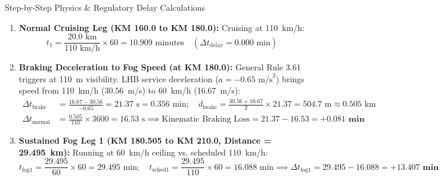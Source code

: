 \documentclass[10pt, a4paper]{article}
\begin{document}
\begin{statutebox}{Step-by-Step Physics \& Regulatory Delay Calculations}
\begin{enumerate}[leftmargin=4mm, itemsep=2pt]
  \item \textbf{Normal Cruising Leg (KM 160.0 to KM 180.0):} Cruising at 110~km/h:
  \begin{equation*}
    t_1 = \frac{20.0\text{ km}}{110\text{ km/h}} \times 60 = 10.909\text{ minutes} \quad (\Delta t_{\text{delay}} = 0.000\text{ min})
  \end{equation*}

  \item \textbf{Braking Deceleration to Fog Speed (at KM 180.0):} General Rule 3.61 triggers at 110~m visibility. LHB service deceleration ($a = -0.65\text{ m/s}^2$) brings speed from 110~km/h (30.56~m/s) to 60~km/h (16.67~m/s):
  \begin{align*}
    \Delta t_{\text{brake}} &= \frac{16.67 - 30.56}{-0.65} = 21.37\text{ s} = 0.356\text{ min}; \quad d_{\text{brake}} = \frac{30.56 + 16.67}{2} \times 21.37 = 504.7\text{ m} \approx 0.505\text{ km} \\
    \Delta t_{\text{normal}} &= \frac{0.505}{110} \times 3600 = 16.53\text{ s} \implies \text{Kinematic Braking Loss} = 21.37 - 16.53 = \mathbf{+0.081\text{ min}}
  \end{align*}

  \item \textbf{Sustained Fog Leg 1 (KM 180.505 to KM 210.0, Distance = 29.495~km):} Running at 60~km/h ceiling vs. scheduled 110~km/h:
  \begin{equation*}
    t_{\text{fog1}} = \frac{29.495}{60} \times 60 = 29.495\text{ min}; \quad t_{\text{sched1}} = \frac{29.495}{110} \times 60 = 16.088\text{ min} \implies \Delta t_{\text{fog1}} = 29.495 - 16.088 = \mathbf{+13.407\text{ min}}
  \end{equation*}


\end{enumerate}
\end{statutebox}
\end{document}
